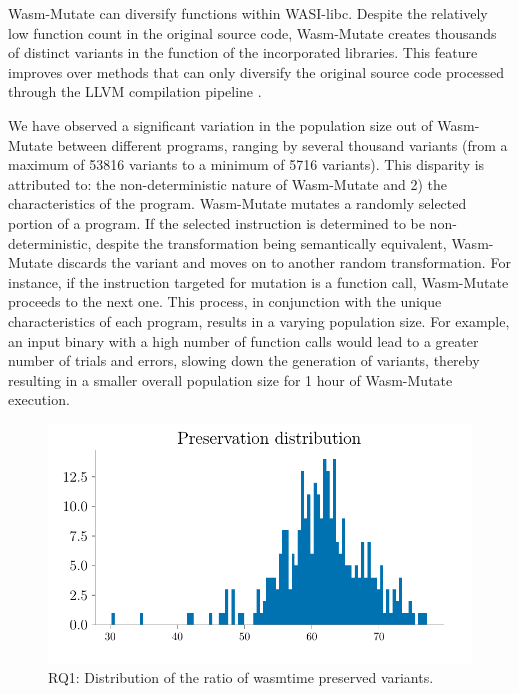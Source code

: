 \documentclass[sigplan,screen]{acmart}
\newcommand*\badge[1]{ \colorbox{red}{\color{white}#1}}
\newcommand{\tool}{{\sc Wasm-Mutate}\xspace}
\newcommand{\todo}[1]{%
\refstepcounter{todo}
\noindent\textbf{\badge{TODO}} {\color{red}#1}
\addcontentsline{td}{todo}
{\color{red}\thesection.\thetodo\xspace #1}}
\begin{document}
\tool can diversify functions within WASI-libc. 
Despite the relatively low function count in the original source code,  \tool creates thousands of distinct variants in the function of the incorporated libraries. 
This feature improves over methods that can only diversify the original source code processed through the LLVM compilation pipeline \cite{arteaga2020crow}. 



We have observed a significant variation in the population size out of \tool between different programs, ranging by several thousand variants (from a maximum of 53816 variants to a minimum of 5716 variants).
This disparity is attributed to:
the non-deterministic nature of \tool and 2) the characteristics of the program. 
\tool mutates a randomly selected portion of a program. 
If the selected instruction is determined to be non-deterministic, despite the transformation being semantically equivalent, \tool discards the variant and moves on to another random transformation.
For instance, if the instruction targeted for mutation is a function call, \tool proceeds to the next one.
This process, in conjunction with the unique characteristics of each program, results in a varying population size. 
For example, an input binary with a high number of function calls would lead to a greater number of trials and errors, slowing down the generation of variants, thereby resulting in a smaller overall population size for 1 hour of \tool execution.





\begin{figure}
    \centering
    \includegraphics[width=\linewidth]{plots/rq1/preservation.pdf}
    \caption{RQ1: Distribution of the ratio of wasmtime preserved variants.}
  \label{rq1:plot:preservation}
\end{figure}
\end{document}
